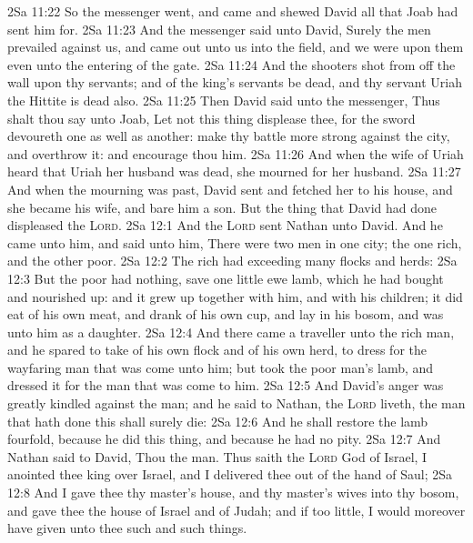 \vs 2Sa 11:22 So the messenger went, and came and shewed David all that Joab had sent him for.
\vs 2Sa 11:23 And the messenger said unto David, Surely the men prevailed against us, and came out unto us into the field, and we were upon them even unto the entering of the gate.
\vs 2Sa 11:24 And the shooters shot from off the wall upon thy servants; and  of the king's servants be dead, and thy servant Uriah the Hittite is dead also.
\vs 2Sa 11:25 Then David said unto the messenger, Thus shalt thou say unto Joab, Let not this thing displease thee, for the sword devoureth one as well as another: make thy battle more strong against the city, and overthrow it: and encourage thou him.
\vs 2Sa 11:26 And when the wife of Uriah heard that Uriah her husband was dead, she mourned for her husband.
\vs 2Sa 11:27 And when the mourning was past, David sent and fetched her to his house, and she became his wife, and bare him a son. But the thing that David had done displeased the \textsc{Lord}.
\vs 2Sa 12:1 And the \textsc{Lord} sent Nathan unto David. And he came unto him, and said unto him, There were two men in one city; the one rich, and the other poor.
\vs 2Sa 12:2 The rich  had exceeding many flocks and herds:
\vs 2Sa 12:3 But the poor  had nothing, save one little ewe lamb, which he had bought and nourished up: and it grew up together with him, and with his children; it did eat of his own meat, and drank of his own cup, and lay in his bosom, and was unto him as a daughter.
\vs 2Sa 12:4 And there came a traveller unto the rich man, and he spared to take of his own flock and of his own herd, to dress for the wayfaring man that was come unto him; but took the poor man's lamb, and dressed it for the man that was come to him.
\vs 2Sa 12:5 And David's anger was greatly kindled against the man; and he said to Nathan,  the \textsc{Lord} liveth, the man that hath done this  shall surely die:
\vs 2Sa 12:6 And he shall restore the lamb fourfold, because he did this thing, and because he had no pity.
\vs 2Sa 12:7 And Nathan said to David, Thou  the man. Thus saith the \textsc{Lord} God of Israel, I anointed thee king over Israel, and I delivered thee out of the hand of Saul;
\vs 2Sa 12:8 And I gave thee thy master's house, and thy master's wives into thy bosom, and gave thee the house of Israel and of Judah; and if  too little, I would moreover have given unto thee such and such things.
